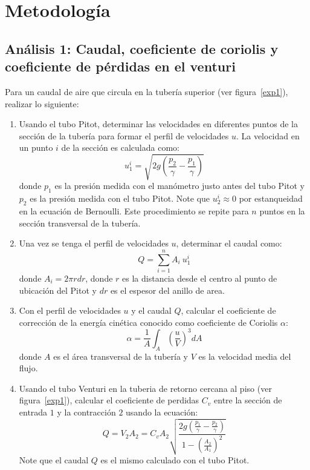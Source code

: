 \documentclass[10pt, a4paper]{exam}
\begin{document}
\section{Metodolog\'ia}
\subsection{An\'alisis 1: Caudal, coeficiente de coriolis y coeficiente de p\'erdidas en el venturi}
Para un caudal de aire que circula en la tuber\'ia superior (ver figura~\ref{exp1}), realizar lo siguiente: 
\begin{enumerate}
    \item Usando el tubo Pitot, determinar las velocidades en diferentes puntos de la secci\'on de la tuber\'ia para formar el perfil de velocidades $u$. La velocidad en un punto $i$ de la secci\'on es calculada como:
    $$
    u_1^i = \sqrt{2g \left( \frac{p_2}{\gamma}-\frac{p_1}{\gamma}\right)}
    $$
    donde $p_1$ es la presi\'on medida con el man\'ometro justo antes del tubo Pitot y $p_2$ es la presi\'on medida con el tubo Pitot. Note que $u_2^i \approx 0$ por estanqueidad en la ecuaci\'on de Bernoulli. Este procedimiento se repite para $n$ puntos en la secci\'on transversal de la tuber\'ia.
    \item Una vez se tenga el perfil de velocidades $u$, determinar el caudal como:
    $$
    Q = \sum_{i=1}^n A_i\ u_1^i
    $$
    donde $A_i =2\pi r dr$, donde $r$ es la distancia desde el centro al punto de ubicaci\'on del Pitot y $dr$ es el espesor del anillo de area.
    \item Con el perfil de velocidades $u$ y el caudal $Q$, calcular el coeficiente de correcci\'on de la energ\'ia cin\'etica conocido como coeficiente de Coriolis $\alpha$:
    $$
    \alpha = \frac{1}{A} \int_A \left( \frac{u}{V}\right)^3 dA
    $$
    donde $A$ es el \'area transversal de la tuber\'ia y $V$ es la velocidad media del flujo.
    \item Usando el tubo Venturi en la tuberia de retorno cercana al piso (ver figura~\ref{exp1}), calcular el coeficiente de perdidas $C_v$ entre la secci\'on de entrada $1$ y la contracci\'on $2$ usando la ecuaci\'on:
    $$
    Q=V_2 A_2 = C_v A_2 \sqrt{\frac{2g\left(\frac{p_1}{\gamma}-\frac{p_2}{\gamma}\right)}{1-\left(\frac{A_2}{A_1}\right)^2}}
    $$
    Note que el caudal $Q$ es el mismo calculado con el tubo Pitot.
\end{enumerate}
\end{document}
